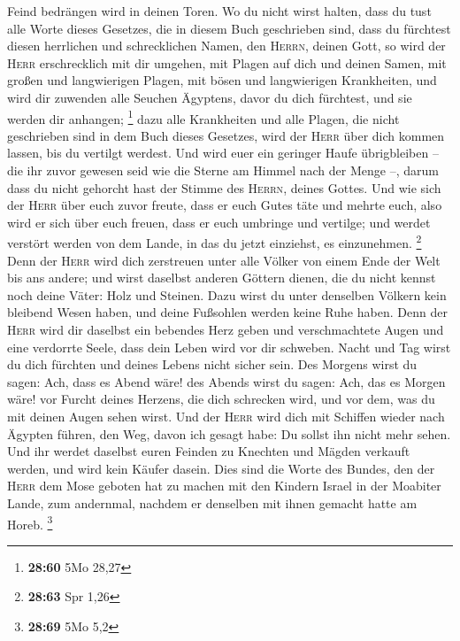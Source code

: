 Feind bedrängen wird in deinen Toren.  Wo du nicht wirst
halten, dass du tust alle Worte dieses Gesetzes, die in diesem Buch
geschrieben sind, dass du fürchtest diesen herrlichen und schrecklichen
Namen, den \textsc{Herrn}, deinen Gott,  so wird der
\textsc{Herr} erschrecklich mit dir umgehen, mit Plagen auf dich und
deinen Samen, mit großen und langwierigen Plagen, mit bösen und
langwierigen Krankheiten,  und wird dir zuwenden alle
Seuchen Ägyptens, davor du dich fürchtest, und sie werden dir anhangen;
\footnote{\textbf{28:60} 5Mo 28,27}  dazu alle
Krankheiten und alle Plagen, die nicht geschrieben sind in dem Buch
dieses Gesetzes, wird der \textsc{Herr} über dich kommen lassen, bis du
vertilgt werdest.  Und wird euer ein geringer Haufe
übrigbleiben -- die ihr zuvor gewesen seid wie die Sterne am Himmel nach
der Menge --, darum dass du nicht gehorcht hast der Stimme des
\textsc{Herrn}, deines Gottes.  Und wie sich der
\textsc{Herr} über euch zuvor freute, dass er euch Gutes täte und mehrte
euch, also wird er sich über euch freuen, dass er euch umbringe und
vertilge; und werdet verstört werden von dem Lande, in das du jetzt
einziehst, es einzunehmen. \footnote{\textbf{28:63} Spr 1,26}
 Denn der \textsc{Herr} wird dich zerstreuen unter alle
Völker von einem Ende der Welt bis ans andere; und wirst daselbst
anderen Göttern dienen, die du nicht kennst noch deine Väter: Holz und
Steinen.  Dazu wirst du unter denselben Völkern kein
bleibend Wesen haben, und deine Fußsohlen werden keine Ruhe haben. Denn
der \textsc{Herr} wird dir daselbst ein bebendes Herz geben und
verschmachtete Augen und eine verdorrte Seele,  dass dein
Leben wird vor dir schweben. Nacht und Tag wirst du dich fürchten und
deines Lebens nicht sicher sein.  Des Morgens wirst du
sagen: Ach, dass es Abend wäre! des Abends wirst du sagen: Ach, das es
Morgen wäre! vor Furcht deines Herzens, die dich schrecken wird, und vor
dem, was du mit deinen Augen sehen wirst.  Und der
\textsc{Herr} wird dich mit Schiffen wieder nach Ägypten führen, den
Weg, davon ich gesagt habe: Du sollst ihn nicht mehr sehen. Und ihr
werdet daselbst euren Feinden zu Knechten und Mägden verkauft werden,
und wird kein Käufer dasein.  Dies sind die Worte des
Bundes, den der \textsc{Herr} dem Mose geboten hat zu machen mit den
Kindern Israel in der Moabiter Lande, zum andernmal, nachdem er
denselben mit ihnen gemacht hatte am Horeb. \footnote{\textbf{28:69} 5Mo
  5,2}

